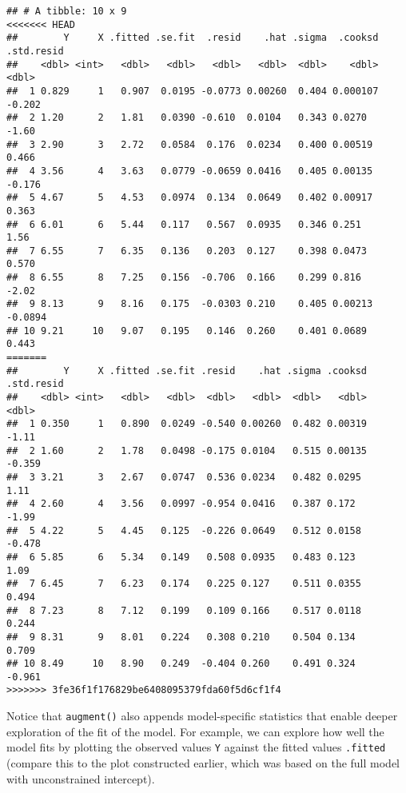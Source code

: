 \documentclass[
]{book}
\begin{document}
\begin{verbatim}
## # A tibble: 10 x 9
<<<<<<< HEAD
##        Y     X .fitted .se.fit  .resid    .hat .sigma  .cooksd .std.resid
##    <dbl> <int>   <dbl>   <dbl>   <dbl>   <dbl>  <dbl>    <dbl>      <dbl>
##  1 0.829     1   0.907  0.0195 -0.0773 0.00260  0.404 0.000107    -0.202 
##  2 1.20      2   1.81   0.0390 -0.610  0.0104   0.343 0.0270      -1.60  
##  3 2.90      3   2.72   0.0584  0.176  0.0234   0.400 0.00519      0.466 
##  4 3.56      4   3.63   0.0779 -0.0659 0.0416   0.405 0.00135     -0.176 
##  5 4.67      5   4.53   0.0974  0.134  0.0649   0.402 0.00917      0.363 
##  6 6.01      6   5.44   0.117   0.567  0.0935   0.346 0.251        1.56  
##  7 6.55      7   6.35   0.136   0.203  0.127    0.398 0.0473       0.570 
##  8 6.55      8   7.25   0.156  -0.706  0.166    0.299 0.816       -2.02  
##  9 8.13      9   8.16   0.175  -0.0303 0.210    0.405 0.00213     -0.0894
## 10 9.21     10   9.07   0.195   0.146  0.260    0.401 0.0689       0.443
=======
##        Y     X .fitted .se.fit .resid    .hat .sigma .cooksd .std.resid
##    <dbl> <int>   <dbl>   <dbl>  <dbl>   <dbl>  <dbl>   <dbl>      <dbl>
##  1 0.350     1   0.890  0.0249 -0.540 0.00260  0.482 0.00319     -1.11 
##  2 1.60      2   1.78   0.0498 -0.175 0.0104   0.515 0.00135     -0.359
##  3 3.21      3   2.67   0.0747  0.536 0.0234   0.482 0.0295       1.11 
##  4 2.60      4   3.56   0.0997 -0.954 0.0416   0.387 0.172       -1.99 
##  5 4.22      5   4.45   0.125  -0.226 0.0649   0.512 0.0158      -0.478
##  6 5.85      6   5.34   0.149   0.508 0.0935   0.483 0.123        1.09 
##  7 6.45      7   6.23   0.174   0.225 0.127    0.511 0.0355       0.494
##  8 7.23      8   7.12   0.199   0.109 0.166    0.517 0.0118       0.244
##  9 8.31      9   8.01   0.224   0.308 0.210    0.504 0.134        0.709
## 10 8.49     10   8.90   0.249  -0.404 0.260    0.491 0.324       -0.961
>>>>>>> 3fe36f1f176829be6408095379fda60f5d6cf1f4
\end{verbatim}

Notice that \texttt{augment()} also appends model-specific statistics that enable deeper exploration of the fit of the model. For example, we can explore how well the model fits by plotting the observed values \texttt{Y} against the fitted values \texttt{.fitted} (compare this to the plot constructed earlier, which was based on the full model with unconstrained intercept).
\end{document}
